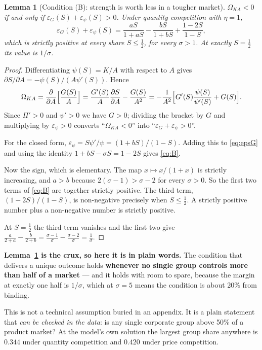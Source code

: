 \documentclass[11pt]{article}
\newenvironment{keypoint}
  {\begin{lrbox}{\kbox}\begin{minipage}{0.93\textwidth}\vspace{3pt}}
  {\vspace{3pt}\end{minipage}\end{lrbox}\begin{center}\fbox{\usebox{\kbox}}\end{center}}
\theoremstyle{plain}
\newtheorem{lemma}{Lemma}
\theoremstyle{remark}
\theoremstyle{definition}
\begin{document}
\begin{lemma}[Condition (B): strength is worth less in a tougher market]\label{lem:B}
$\Omega_{KA}<0$ if and only if $\varepsilon_G(S)+\varepsilon_\psi(S)>0$. Under quantity
competition with $\eta=1$,
\begin{equation}
  \varepsilon_G(S)+\varepsilon_\psi(S)
  =\frac{aS}{1+aS}-\frac{bS}{1+bS}+\frac{1-2S}{1-S},
  \label{eq:B}
\end{equation}
which is strictly positive at every share $S\le\tfrac12$, for every $\sigma>1$. At
exactly $S=\tfrac12$ its value is $1/\sigma$.
\end{lemma}

\begin{proof}
Differentiating $\psi(S)=K/A$ with respect to $A$ gives
$\partial S/\partial A=-\psi(S)/(A\psi'(S))$. Hence
\[
  \Omega_{KA}=\frac{\partial}{\partial A}\Bigl[\frac{G(S)}{A}\Bigr]
  =\frac{G'(S)}{A}\frac{\partial S}{\partial A}-\frac{G(S)}{A^2}
  =-\frac{1}{A^2}\Bigl[G'(S)\frac{\psi(S)}{\psi'(S)}+G(S)\Bigr].
\]
Since $\Pi'>0$ and $\psi'>0$ we have $G>0$; dividing the bracket by $G$ and
multiplying by $\varepsilon_\psi>0$ converts ``$\Omega_{KA}<0$'' into
``$\varepsilon_G+\varepsilon_\psi>0$''.

For the closed form, $\varepsilon_\psi=S\psi'/\psi=(1+bS)/(1-S)$. Adding this to
\eqref{eq:epsG} and using the identity $1+bS-\sigma S=1-2S$ gives \eqref{eq:B}.

Now the sign, which is elementary. The map $x\mapsto x/(1+x)$ is strictly increasing,
and $a>b$ because $2(\sigma-1)>\sigma-2$ for every $\sigma>0$. So the first two terms
of \eqref{eq:B} are together strictly positive. The third term, $(1-2S)/(1-S)$, is
non-negative precisely when $S\le\frac12$. A strictly positive number plus a
non-negative number is strictly positive.

At $S=\frac12$ the third term vanishes and the first two give
$\frac{a}{2+a}-\frac{b}{2+b}=\frac{\sigma-1}{\sigma}-\frac{\sigma-2}{\sigma}
=\frac1\sigma$.
\end{proof}

\begin{keypoint}
\textbf{Lemma~\ref{lem:B} is the crux, so here it is in plain words.} The condition
that delivers a unique outcome holds \textbf{whenever no single group controls more
than half of a market} --- and it holds with room to spare, because the margin at
exactly one half is $1/\sigma$, which at $\sigma=5$ means the condition is about 20\%
from binding.

This is not a technical assumption buried in an appendix. It is a plain statement that
\emph{can be checked in the data}: is any single corporate group above 50\% of a
product market? At the model's own solution the largest group share anywhere is
$0.344$ under quantity competition and $0.420$ under price competition.
\end{keypoint}
\end{document}
